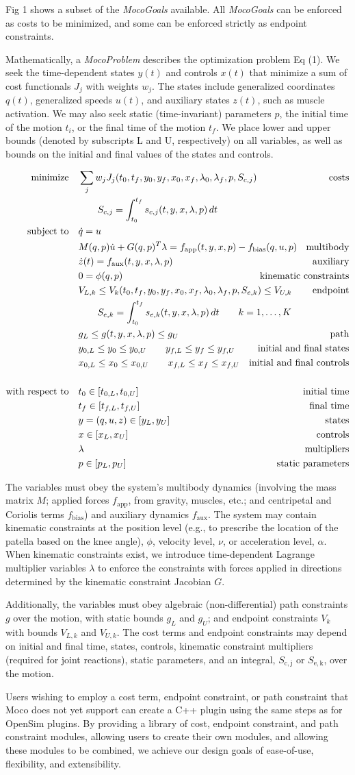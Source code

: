 \documentclass[10pt,letterpaper]{article}
\newcommand{\ocp}{
\begin{align}
    \begin{aligned}
        \mbox{minimize}
         \quad & \sum_j w_{j} J_{j}(t_0, t_f, y_0, y_f, x_{0}, \mathrlap{x_{f}, \lambda_0, \lambda_f, p, S_{c,j})} & \textrm{costs} \\
        & \quad\quad S_{c,j} = \int_{t_0}^{t_f} s_{c,j}(t, y, x, \lambda, p)\,dt  \\
        \mbox{subject to}
         \quad & \dot{q} = u \\
         & M(q, p)\dot{u} + G(q, p)^T \lambda = \mathrlap{f_{\mathrm{app}}(t, y, x, p) - f_{\mathrm{bias}}(q, u, p)}  & \textrm{multibody} \\
         & \dot{z}(t) = f_{\mathrm{aux}}(t, y, x, \lambda, p) & \textrm{auxiliary} \\
         & 0 = \phi(q, p) & \textrm{kinematic constraints} \\
         & V_{L,k} \leq V_k(t_0, t_f, y_0, \mathrlap{y_f, x_{0}, x_{f}, \lambda_0, \lambda_f, p, S_{e,k}) \leq V_{U,k}} & \textrm{endpoint} \\
         & \quad\quad S_{e,k} = \mathrlap{\int_{t_0}^{t_f} s_{e,k}(t, y, x, \lambda, p)\,dt \quad\quad k = 1, \ldots, K}\\
         & g_{L} \leq g(t, y, x, \lambda, p) \leq g_{U} & \textrm{path} \\
         & y_{0,L} \leq y_0 \leq y_{0,U} \quad\quad y_{f,L} \leq y_f \leq y_{f,U} & \textrm{initial and final states} \\
         & x_{0,L} \leq x_0 \leq x_{0,U} \quad\quad x_{f,L} \leq x_f \leq x_{f,U} & \textrm{initial and final controls} \\
        \\
         \mbox{with respect to} \quad
         & t_0 \in [t_{0,L}, t_{0,U}] & \textrm{initial time} \\
         & t_f \in [t_{f,L}, t_{f,U}] & \textrm{final time} \\
         & y = (q, u, z) \in [y_{L}, y_{U}] & \textrm{states} \\
         & x \in [x_{L}, x_{U}] & \textrm{controls} \\
         & \lambda & \textrm{multipliers} \\
         & p \in [p_{L}, p_{U}] & \textrm{static parameters}
    \end{aligned}
\end{align}
}
\begin{document}
Fig 1 shows a subset of the \textit{MocoGoals} available. All \textit{MocoGoals} can be enforced as costs to be minimized, and some can be enforced strictly as endpoint constraints.

Mathematically, a \textit{MocoProblem} describes the optimization problem Eq (1). We seek the time-dependent states $y(t)$ and controls $x(t)$ that minimize a sum of cost functionals $J_j$ with weights $w_j$. The states include generalized coordinates $q(t)$, generalized speeds $u(t)$, and auxiliary states $z(t)$, such as muscle activation. We may also seek static (time-invariant) parameters $p$, the initial time of the motion $t_i$, or the final time of the motion $t_f$. We place lower and upper bounds (denoted by subscripts L and U, respectively) on all variables, as well as bounds on the initial and final values of the states and controls.

\ocp

The variables must obey the system’s multibody dynamics (involving the mass matrix $M$; applied forces $f_\mathrm{app}$, from gravity, muscles, etc.; and centripetal and Coriolis terms $f_\mathrm{bias}$) and auxiliary dynamics $f_\mathrm{aux}$. The system may contain kinematic constraints at the position level (e.g., to prescribe the location of the patella based on the knee angle), $\phi$, velocity level, $\nu$, or acceleration level, $\alpha$. When kinematic constraints exist, we introduce time-dependent Lagrange multiplier variables $\lambda$ to enforce the constraints with forces applied in directions determined by the kinematic constraint Jacobian $G$.

Additionally, the variables must obey algebraic (non-differential) path constraints $g$ over the motion, with static bounds $g_L$ and $g_U$; and endpoint constraints $V_k$ with bounds $V_{L,k}$ and $V_{U,k}$. The cost terms and endpoint constraints may depend on initial and final time, states, controls, kinematic constraint multipliers (required for joint reactions), static parameters, and an integral, $S_\mathrm{c,j}$ or $S_\mathrm{e,k}$, over the motion.

Users wishing to employ a cost term, endpoint constraint, or path constraint that Moco does not yet support can create a C++ plugin using the same steps as for OpenSim plugins. By providing a library of cost, endpoint constraint, and path constraint modules, allowing users to create their own modules, and allowing these modules to be combined, we achieve our design goals of ease-of-use, flexibility, and extensibility.
\end{document}
